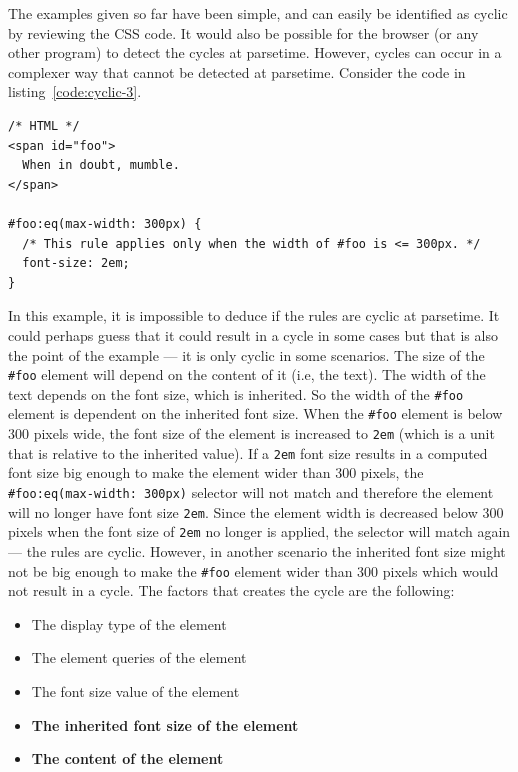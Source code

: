 \documentclass[a4paper,11pt]{kth-mag}
\newcommand{\code}[1]{\texttt{#1}}
\begin{document}
          The examples given so far have been simple, and can easily be identified as cyclic by reviewing the \gls{CSS} code.
          It would also be possible for the browser (or any other program) to detect the cycles at parsetime.
          However, cycles can occur in a complexer way that cannot be detected at parsetime.
          Consider the code in listing~\ref{code:cyclic-3}.
          \begin{lstlisting}[caption={Example of cyclic rules that cannot be detected at parsetime.}, captionpos=b, label={code:cyclic-3}]
/* HTML */
<span id="foo">
  When in doubt, mumble.
</span>

#foo:eq(max-width: 300px) {
  /* This rule applies only when the width of #foo is <= 300px. */
  font-size: 2em;
}
          \end{lstlisting}
          In this example, it is impossible to deduce if the rules are cyclic at parsetime.
          It could perhaps guess that it could result in a cycle in some cases but that is also the point of the example --- it is only cyclic in some scenarios.
          The size of the \code{\#foo} element will depend on the content of it (i.e, the text).
          The width of the text depends on the font size, which is inherited.
          So the width of the \code{\#foo} \gls{element} is dependent on the inherited font size.
          When the \code{\#foo} \gls{element} is below 300 pixels wide, the font size of the element is increased to \code{2em} (which is a unit that is relative to the inherited value).
          If a \code{2em} font size results in a computed font size big enough to make the \gls{element} wider than 300 pixels, the \code{\#foo:eq(max-width: 300px)} selector will not match and therefore the element will no longer have font size \code{2em}.
          Since the element width is decreased below 300 pixels when the font size of \code{2em} no longer is applied, the selector will match again --- the rules are cyclic.
          However, in another scenario the inherited font size might not be big enough to make the \code{\#foo} element wider than 300 pixels which would not result in a cycle.
          The factors that creates the cycle are the following:
          \begin{itemize}
            \item The display type of the \gls{element}
            \item The \gls{element} queries of the \gls{element}
            \item The font size value of the \gls{element}
            \item \textbf{The inherited font size of the \gls{element}}
            \item \textbf{The content of the \gls{element}}
          \end{itemize}
\end{document}
